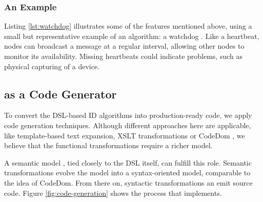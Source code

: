 \documentclass[conference]{IEEEtran}
\begin{document}
\subsubsection{An Example}

Listing \ref{lst:watchdog} illustrates some of the features mentioned above,
using a small but representative example of an algorithm: a
watchdog \cite{mishra2004intrusion}. Like a heartbeat, nodes can broadcast a
message at a regular interval, allowing other nodes to monitor its
availability. Missing heartbeats could indicate problems, such as physical
capturing of a device.



\subsection{\NAME as a Code Generator}
\label{code-generator-design}

To convert the DSL-based ID algorithms into production-ready code, we apply
code generation techniques. Although different approaches here are applicable,
like template-based text expansion, XSLT transformations or CodeDom
\cite{dollard2004code}, we believe that the functional transformations require
a richer model.

A semantic model \cite{fowler2010domain}, tied closely to the DSL itself, can
fulfill this role. Semantic transformations evolve the model into a
syntax-oriented model, comparable to the idea of CodeDom. From there on,
syntactic transformations an emit source code. Figure \ref{fig:code-generation}
shows the process that \NAME implements.
\end{document}
